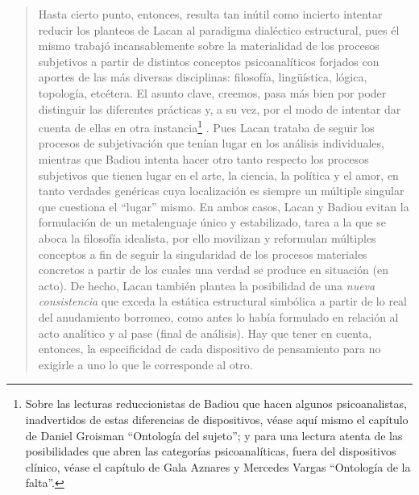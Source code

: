 \begin{quote}
Hasta cierto punto, entonces, resulta tan inútil como incierto intentar reducir los planteos de Lacan al paradigma dialéctico estructural, pues él mismo trabajó incansablemente sobre la materialidad de los procesos subjetivos a partir de distintos conceptos psicoanalíticos forjados con aportes de las más diversas disciplinas: filosofía, lingüística, lógica, topología, etcétera. El asunto clave, creemos, pasa más bien por poder distinguir las diferentes prácticas y, a su vez, por el modo de intentar dar cuenta de ellas en otra instancia\footnote{Sobre las lecturas reduccionistas de Badiou que hacen algunos psicoanalistas, inadvertidos de estas diferencias de dispositivos, véase aquí mismo el capítulo de Daniel Groisman \enquote{Ontología del sujeto}; y para una lectura atenta de las posibilidades que abren las categorías psicoanalíticas, fuera del dispositivos clínico, véase el capítulo de Gala Aznares y Mercedes Vargas \enquote{Ontología de la falta}.} . Pues Lacan trataba de seguir los procesos de subjetivación que tenían lugar en los análisis individuales, mientras que Badiou intenta hacer otro tanto respecto los procesos subjetivos que tienen lugar en el arte, la ciencia, la política y el amor, en tanto verdades genéricas cuya localización es siempre un múltiple singular que cuestiona el \enquote{lugar} mismo. En ambos casos, Lacan y Badiou evitan la formulación de un metalenguaje único y estabilizado, tarea a la que se aboca la filosofía idealista, por ello movilizan y reformulan múltiples conceptos a fin de seguir la singularidad de los procesos materiales concretos a partir de los cuales una verdad se produce en situación (en acto). De hecho, Lacan también plantea la posibilidad de una \emph{nueva consistencia} que exceda la estática estructural simbólica a partir de lo real del anudamiento borromeo, como antes lo había formulado en relación al acto analítico y al pase (final de análisis). Hay que tener en cuenta, entonces, la especificidad de cada dispositivo de pensamiento para no exigirle a uno lo que le corresponde al otro.


\end{quote}
